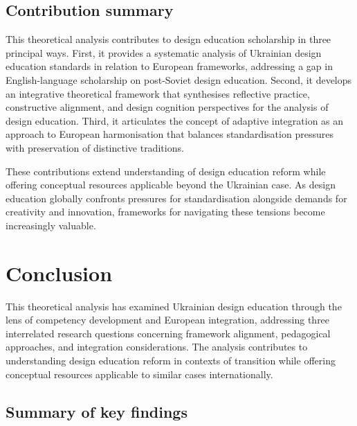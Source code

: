 \documentclass[ed]{acnsart}
\begin{document}
	\subsection{Contribution summary}
	
	This theoretical analysis contributes to design education scholarship in three principal ways. First, it provides a systematic analysis of Ukrainian design education standards in relation to European frameworks, addressing a gap in English-language scholarship on post-Soviet design education. Second, it develops an integrative theoretical framework that synthesises reflective practice, constructive alignment, and design cognition perspectives for the analysis of design education. Third, it articulates the concept of adaptive integration as an approach to European harmonisation that balances standardisation pressures with preservation of distinctive traditions.
	
	These contributions extend understanding of design education reform while offering conceptual resources applicable beyond the Ukrainian case. As design education globally confronts pressures for standardisation alongside demands for creativity and innovation, frameworks for navigating these tensions become increasingly valuable.
	
	
	\section{Conclusion}
	\label{sec:conclusion}
	
	This theoretical analysis has examined Ukrainian design education through the lens of competency development and European integration, addressing three interrelated research questions concerning framework alignment, pedagogical approaches, and integration considerations. The analysis contributes to understanding design education reform in contexts of transition while offering conceptual resources applicable to similar cases internationally.
	
	\subsection{Summary of key findings}
	
\end{document}
